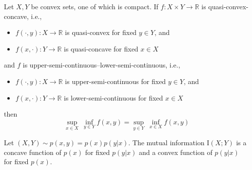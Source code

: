 \documentclass[final,12pt]{colt2018}
\newcommand{\mb}{\mathbb}
\newcommand{\II}[1]{\mathrm{I}\left(#1\right)}
\begin{document}
\begin{theorem}\label{sion-minimax}
	Let $X, Y$ be convex sets, one of which is compact. If $f:X\times Y \rightarrow \mb{R}$ is quasi-convex-concave, i.e.,
	\begin{itemize}
		\item{$f(\cdot, y):X\rightarrow\mb{R}$ is quasi-convex for fixed $y\in Y$, and}
		\item{$f(x, \cdot):Y\rightarrow\mb{R}$ is quasi-concave for fixed $x\in X$}
	\end{itemize}
	and $f$ is upper-semi-continuous--lower-semi-continuous, i.e.,
	\begin{itemize}
		\item{$f(\cdot, y):X\rightarrow\mb{R}$ is upper-semi-continuous for fixed $y\in Y$, and}
		\item{$f(x, \cdot):Y\rightarrow\mb{R}$ is lower-semi-continuous for fixed $x\in X$}
	\end{itemize}
	then
	\[
	\sup_{x \in X} \: \inf_{y \in Y} f(x,y) = \sup_{y \in Y} \: \inf_{x \in X} f(x,y)
	\]
\end{theorem}

\begin{lemma}\label{cover06-concave}
	Let $(X,Y) \sim p(x, y) = p(x)p(y|x)$. The mutual information $\II{X;Y}$ is a concave function of $p(x)$ for fixed $p(y|x)$ and a convex
	function of $p(y|x)$ for fixed $p(x)$.
\end{lemma}
\end{document}
